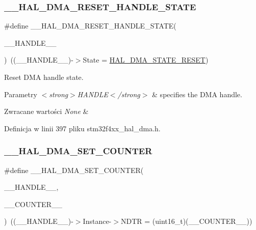 \subsubsection{\texorpdfstring{\+\_\+\+\_\+\+H\+A\+L\+\_\+\+D\+M\+A\+\_\+\+R\+E\+S\+E\+T\+\_\+\+H\+A\+N\+D\+L\+E\+\_\+\+S\+T\+A\+TE}{\_\_HAL\_DMA\_RESET\_HANDLE\_STATE}}
{\footnotesize\ttfamily \#define \+\_\+\+\_\+\+H\+A\+L\+\_\+\+D\+M\+A\+\_\+\+R\+E\+S\+E\+T\+\_\+\+H\+A\+N\+D\+L\+E\+\_\+\+S\+T\+A\+TE(\begin{DoxyParamCaption}\item[{}]{\+\_\+\+\_\+\+H\+A\+N\+D\+L\+E\+\_\+\+\_\+ }\end{DoxyParamCaption})~((\+\_\+\+\_\+\+H\+A\+N\+D\+L\+E\+\_\+\+\_\+)-\/$>$State = \hyperlink{group___d_m_a___exported___types_gga9c012af359987a240826f29073bbe463a9e7be73da32b8c837cde0318e0d5eed2}{H\+A\+L\+\_\+\+D\+M\+A\+\_\+\+S\+T\+A\+T\+E\+\_\+\+R\+E\+S\+ET})}



Reset D\+MA handle state. 


\begin{DoxyParams}{Parametry}
{\em $<$strong$>$\+H\+A\+N\+D\+L\+E$<$/strong$>$} & specifies the D\+MA handle. \\
\hline
\end{DoxyParams}

\begin{DoxyRetVals}{Zwracane wartości}
{\em None} & \\
\hline
\end{DoxyRetVals}


Definicja w linii 397 pliku stm32f4xx\+\_\+hal\+\_\+dma.\+h.

\mbox{\label{group___d_m_a_ga448a8f809df86ccffae200ffd33d0a82}} 
\subsubsection{\texorpdfstring{\+\_\+\+\_\+\+H\+A\+L\+\_\+\+D\+M\+A\+\_\+\+S\+E\+T\+\_\+\+C\+O\+U\+N\+T\+ER}{\_\_HAL\_DMA\_SET\_COUNTER}}
{\footnotesize\ttfamily \#define \+\_\+\+\_\+\+H\+A\+L\+\_\+\+D\+M\+A\+\_\+\+S\+E\+T\+\_\+\+C\+O\+U\+N\+T\+ER(\begin{DoxyParamCaption}\item[{}]{\+\_\+\+\_\+\+H\+A\+N\+D\+L\+E\+\_\+\+\_\+,  }\item[{}]{\+\_\+\+\_\+\+C\+O\+U\+N\+T\+E\+R\+\_\+\+\_\+ }\end{DoxyParamCaption})~((\+\_\+\+\_\+\+H\+A\+N\+D\+L\+E\+\_\+\+\_\+)-\/$>$Instance-\/$>$N\+D\+TR = (uint16\+\_\+t)(\+\_\+\+\_\+\+C\+O\+U\+N\+T\+E\+R\+\_\+\+\_\+))}



